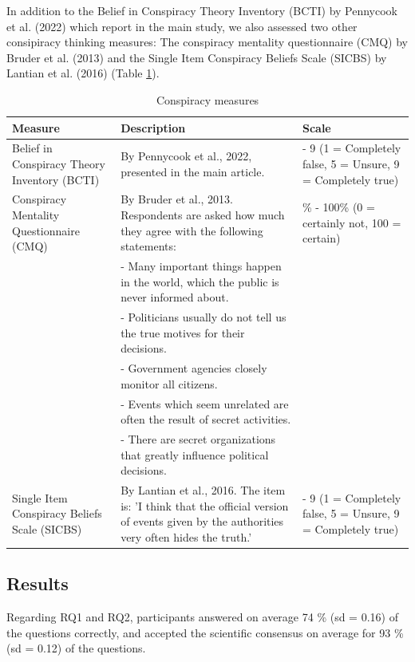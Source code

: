 \documentclass[
  doc,floatsintext]{apa6}
\begin{document}
In addition to the Belief in Conspiracy Theory Inventory (BCTI) by Pennycook et al. (2022) which report in the main study, we also assessed two other consipiracy thinking measures: The conspiracy mentality questionnaire (CMQ) by Bruder et al. (2013) and the Single Item Conspiracy Beliefs Scale (SICBS) by Lantian et al. (2016) (Table \ref{tab:overview-conspiracy-measures}).

\begingroup\fontsize{8}{10}\selectfont

\begin{longtable}[t]{>{\raggedright\arraybackslash}p{10em}>{\raggedright\arraybackslash}p{20em}>{\raggedright\arraybackslash}p{10em}}
\caption{\label{tab:overview-conspiracy-measures}Conspiracy measures}\\
\toprule
Measure & Description & Scale\\
\midrule
Belief in Conspiracy Theory Inventory (BCTI) & By Pennycook et al., 2022, presented in the main article. & 1 - 9 (1 = Completely false, 5 = Unsure, 9 = Completely true)\\
Conspiracy Mentality Questionnaire (CMQ) & By Bruder et al., 2013. Respondents are asked how much they agree with the following statements: & 0\% - 100\% (0 = certainly not, 100 = certain)\\
 & - Many important things happen in the world, which the public is never informed about. & \\
 & - Politicians usually do not tell us the true motives for their decisions. & \\
 & - Government agencies closely monitor all citizens. & \\
\addlinespace
 & - Events which seem unrelated are often the result of secret activities. & \\
 & - There are secret organizations that greatly influence political decisions. & \\
Single Item Conspiracy Beliefs Scale (SICBS) & By Lantian et al., 2016. The item is: 'I think that the official version of events given by the authorities very often hides the truth.' & 1 - 9 (1 = Completely false, 5 = Unsure, 9 = Completely true)\\
\bottomrule
\end{longtable}
\endgroup{}

\subsection{Results}\label{results-1}

Regarding RQ1 and RQ2, participants answered on average 74 \% (sd = 0.16) of the questions correctly, and accepted the scientific consensus on average for 93 \% (sd = 0.12) of the questions.
\end{document}
